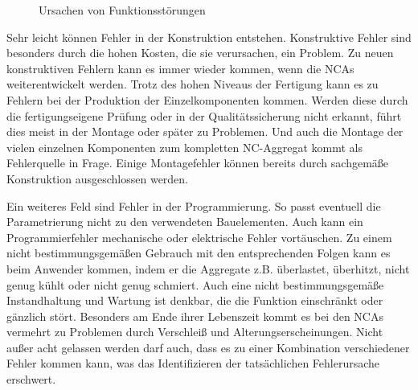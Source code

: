 \begin{figure}[H]
\center
{}
\caption{Ursachen von Funktionsstörungen}
\label{fig:Ursachen_von_Funktionsstoerungen}
\end{figure}


Sehr leicht können Fehler in der Konstruktion entstehen. Konstruktive Fehler sind besonders durch die hohen Kosten, die sie verursachen, ein Problem. Zu neuen konstruktiven Fehlern kann es immer wieder kommen, wenn die NCAs weiterentwickelt werden. Trotz des hohen Niveaus der Fertigung kann es zu Fehlern bei der Produktion der Einzelkomponenten kommen. Werden diese durch die fertigungseigene Prüfung oder in der Qualitätssicherung nicht erkannt, führt dies meist in der Montage oder später zu Problemen. Und auch die Montage der vielen einzelnen Komponenten zum kompletten NC-Aggregat kommt als Fehlerquelle in Frage. Einige Montagefehler können bereits durch sachgemäße Konstruktion ausgeschlossen werden.

Ein weiteres Feld sind Fehler in der Programmierung. So passt eventuell die Parametrierung nicht zu den verwendeten Bauelementen. Auch kann ein Programmierfehler mechanische oder elektrische Fehler vortäuschen. Zu einem nicht bestimmungsgemäßen Gebrauch mit den entsprechenden Folgen kann es beim Anwender kommen, indem er die Aggregate z.B. überlastet, überhitzt, nicht genug kühlt oder nicht genug schmiert. Auch eine nicht bestimmungsgemäße Instandhaltung und Wartung ist denkbar, die die Funktion einschränkt oder gänzlich stört. Besonders am Ende ihrer Lebenszeit kommt es bei den NCAs vermehrt zu Problemen durch Verschleiß und Alterungserscheinungen. Nicht außer acht gelassen werden darf auch, dass es zu einer Kombination verschiedener Fehler kommen kann, was das Identifizieren der tatsächlichen Fehlerursache erschwert. 

